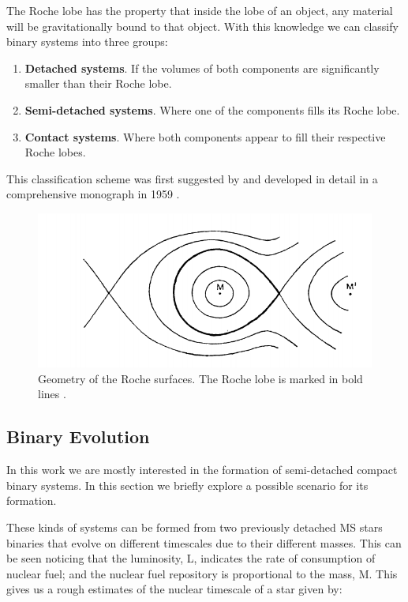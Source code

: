 The Roche lobe has the property that inside the lobe of an object, any material will be gravitationally bound to that object. With this knowledge we can classify binary systems into three groups:

\begin{enumerate}
        \item \textbf{Detached systems}. If the volumes of both components are significantly smaller than their Roche lobe. 
        \item \textbf{Semi-detached systems}. Where one of the components fills its Roche lobe.
        \item \textbf{Contact systems}. Where both components appear to fill their respective Roche lobes. 
\end{enumerate}

This classification scheme was first suggested by \citep{kopal_classification_1955} and developed in detail in a comprehensive monograph in 1959 \citep{kopal_close_1959}. 

\begin{figure}[]
        \centering
\includegraphics[scale=.3]{assets/images/kopalroche.png}
\caption{Geometry of the Roche surfaces. The Roche lobe is marked in bold lines \citep{kopal_close_1959}.}
\label{fig:roche}
\end{figure}


\subsection{Binary Evolution}

In this work we are mostly interested in the formation of semi-detached compact binary systems. In this section we briefly explore a possible scenario for its formation. 

These kinds of systems can be formed from two previously detached MS stars binaries that evolve on different timescales due to their different masses. This can be seen noticing that the luminosity, L, indicates the rate of consumption of nuclear fuel; and the nuclear fuel repository is proportional to the mass, M. This gives us a rough estimates of the nuclear timescale of a star given by:

